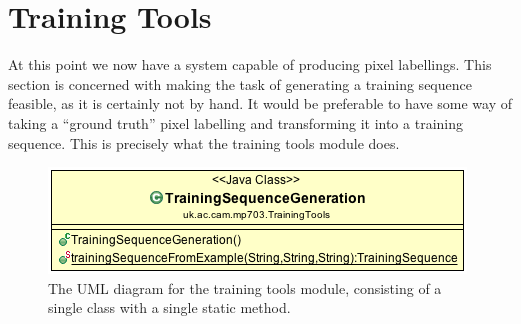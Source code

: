 \documentclass[12pt,twoside,notitlepage]{report}
\begin{document}
    \section{Training Tools} \label{sec:training_tools}
        At this point we now have a system capable of producing pixel labellings. This section is concerned with 
        making the task of generating a training sequence feasible, as it is certainly not by hand. It would be 
        preferable to have some way of taking a ``ground truth'' pixel labelling and transforming it into a training 
        sequence. This is precisely what the training tools module does. 

        \begin{figure}[H]
            \centering
            \includegraphics[scale=0.5]{TrainingTools_UML}
            \caption[The UML diagram for the training tools module.]{The UML diagram for the training tools module, consisting of a single class with a single static method.}
        \end{figure}
\end{document}
